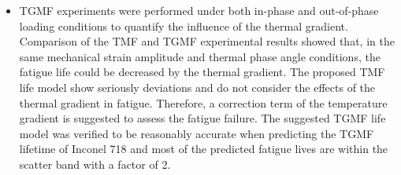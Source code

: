 \begin{itemize}
\item TGMF experiments were performed under both in-phase and out-of-phase loading conditions to quantify the influence of the thermal gradient. Comparison of the TMF and TGMF experimental results showed that, in the same mechanical strain amplitude and thermal phase angle conditions, the fatigue life could be decreased by the thermal gradient. The proposed TMF life model show seriously deviations and do not consider the effects of the thermal gradient in fatigue. Therefore, a correction term of the temperature gradient is suggested to assess the fatigue failure. The suggested TGMF life model was verified to be reasonably accurate when predicting the TGMF lifetime of Inconel 718 and most of the predicted fatigue lives are within the scatter band with a factor of 2.

\end{itemize}